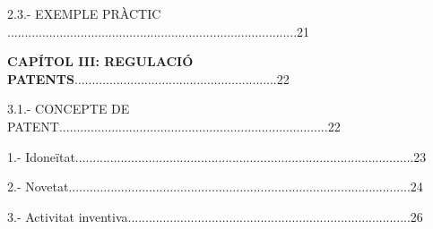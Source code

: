 \documentclass[12pt]{article}
\begin{document}
\vspace{\baselineskip}
\begin{justify}
2.3.- EXEMPLE PRÀCTIC ...................................................................................21
\end{justify}\par


\vspace{\baselineskip}

\vspace{\baselineskip}
\begin{justify}
\textbf{CAPÍTOL III: REGULACIÓ PATENTS}..........................................................22
\end{justify}\par


\vspace{\baselineskip}

\vspace{\baselineskip}
\begin{justify}
3.1.- CONCEPTE DE PATENT.............................................................................22
\end{justify}\par


\vspace{\baselineskip}

\vspace{\baselineskip}
\begin{adjustwidth}{0.49in}{0.0in}
\begin{justify}
1.- Idoneïtat.................................................................................................23
\end{justify}\par

\end{adjustwidth}


\vspace{\baselineskip}
\begin{adjustwidth}{0.49in}{0.0in}
\begin{justify}
2.- Novetat..................................................................................................24
\end{justify}\par

\end{adjustwidth}


\vspace{\baselineskip}
\begin{adjustwidth}{0.49in}{0.0in}
\begin{justify}
3.- Activitat inventiva.................................................................................26
\end{justify}\par

\end{adjustwidth}
\end{document}

